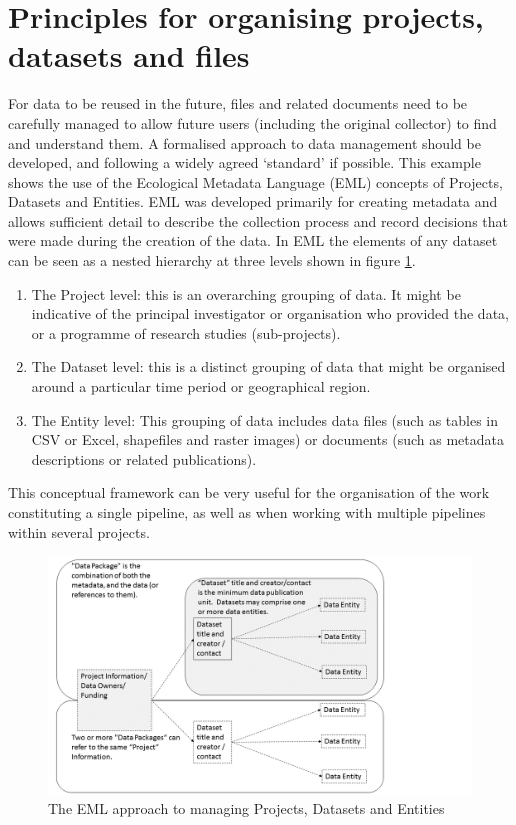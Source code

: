 \documentclass[11pt,a4paper]{article}
\begin{document}
\section{Principles for organising projects, datasets and files}

For data to be reused in the future, files and related documents need to
be carefully managed to allow future users (including the original
collector) to find and understand them. A formalised  approach to 
data management should be developed, and following a widely agreed `standard'
 if possible. This example shows the use of the Ecological Metadata Language
(EML) concepts of Projects, Datasets and Entities.
EML was developed primarily for creating metadata and allows sufficient detail to describe the collection process and record decisions that were made during the creation of the data. 
In EML the elements of any dataset can be seen as a nested hierarchy at
three levels shown in figure \ref{fig:emlproj}.

\begin{enumerate}
\def\labelenumi{\arabic{enumi}.}
\itemsep1pt\parskip0pt
\item
  The Project level: this is an overarching grouping of data. It might
  be indicative of the principal investigator or organisation who
  provided the data, or a programme of research studies (sub-projects).
\item
  The Dataset level: this is a distinct grouping of data that might be
  organised around a particular time period or geographical region.
\item
  The Entity level: This grouping of data includes data files (such as
  tables in CSV or Excel, shapefiles and raster images) or documents
  (such as metadata descriptions or related publications).
\end{enumerate}

This conceptual framework can be very useful for the organisation of the
work constituting a single pipeline, as well as when working with
multiple pipelines within several projects.

\begin{figure}[!h]
\centering
\includegraphics{images/EML_project.png}
\caption{The EML approach to managing Projects, Datasets and Entities}
\label{fig:emlproj}
\end{figure}
\clearpage
\end{document}
